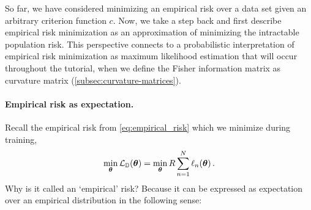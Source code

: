 So far, we have considered minimizing an empirical risk over a data set given an arbitrary criterion function $c$.
Now, we take a step back and first describe empirical risk minimization as an approximation of minimizing the intractable population risk.
This perspective connects to a probabilistic interpretation of empirical risk minimization as maximum likelihood estimation that will occur throughout the tutorial, \eg when we define the Fisher information matrix as curvature matrix (\cref{subsec:curvature-matrices}).

\paragraph{Empirical risk as expectation.} Recall the empirical risk from \cref{eq:empirical_risk} which we minimize during training,
\begin{align*}
  \min_{{\bm{\theta}}} {\mathcal{L}}_{{\mathbb{D}}}({\bm{\theta}}) = \min_{{\bm{\theta}}} R \sum_{n=1}^N \ell_n({\bm{\theta}})\,.
\end{align*}
Why is it called an `empirical' risk?
Because it can be expressed as expectation over an empirical distribution in the following sense:

